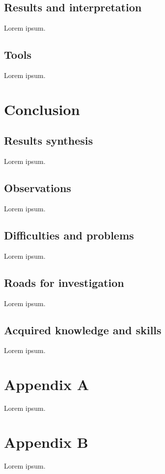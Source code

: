 \documentclass[12pt, a4paper]{report}
\begin{document}
		\section{Results and interpretation}
			Lorem ipsum.

		\section{Tools}
			Lorem ipsum.

	\chapter{Conclusion}
		\section{Results synthesis}
			Lorem ipsum.
		
		\section{Observations}
			Lorem ipsum.
		
		\section{Difficulties and problems}
			Lorem ipsum.
		
		\section{Roads for investigation}
			Lorem ipsum.
		
		\section{Acquired knowledge and skills}
			Lorem ipsum.
	
	
	
	
	\appendix
	\chapter{Appendix A}
		Lorem ipsum.

	\chapter{Appendix B}
		Lorem ipsum.

	\makeutbmbackcover{}
\end{document}
